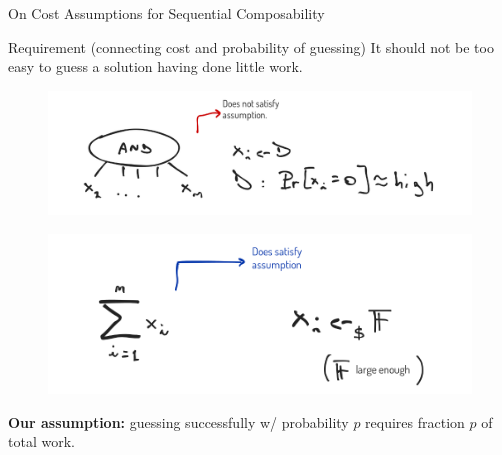 \begin{frame}{On Cost Assumptions for Sequential Composability}
\begin{block}{Requirement (connecting cost and probability of guessing)}\pause
{\small 	It should not be too easy to guess a solution having done little work.} 
\end{block}	
	
\pause
\begin{figure}
	\includegraphics[scale=0.21]{pics/example-and.png}
\end{figure}
\pause
\begin{figure}
	\includegraphics[scale=0.21]{pics/example-sum.png}
\end{figure}
\pause
\textbf{Our assumption:} guessing successfully w/ probability $p$ requires fraction $p$ of total work.
\end{frame}